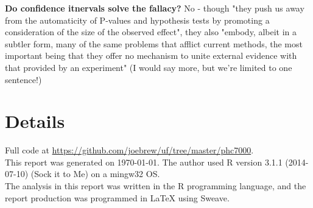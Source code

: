 \documentclass[11pt]{article}
\begin{document}
\begin{multicols}{2}
\noindent \textbf{Do confidence itnervals solve the fallacy?} No - though "they push us away from the automaticity of P-values and hypothesis tests by promoting a consideration of the size of the observed effect", they also "embody, albeit in a subtler form, many of the same problems that afflict current methods, the most important being that they offer no mechanism to unite external evidence with that provided by an experiment" (I would say more, but we're limited to one sentence!)





\end{multicols}
\newpage



\section*{Details}

Full code at \href{https://github.com/joebrew/uf/tree/master/phc7000}{https://github.com/joebrew/uf/tree/master/phc7000}. \\

This report was generated on \today.  The author used R version 3.1.1 (2014-07-10) (Sock it to Me) on a mingw32 OS.  \\

The analysis in this report was written in the R programming language, and the report production was programmed in \LaTeX{} using Sweave.\\
\end{document}
